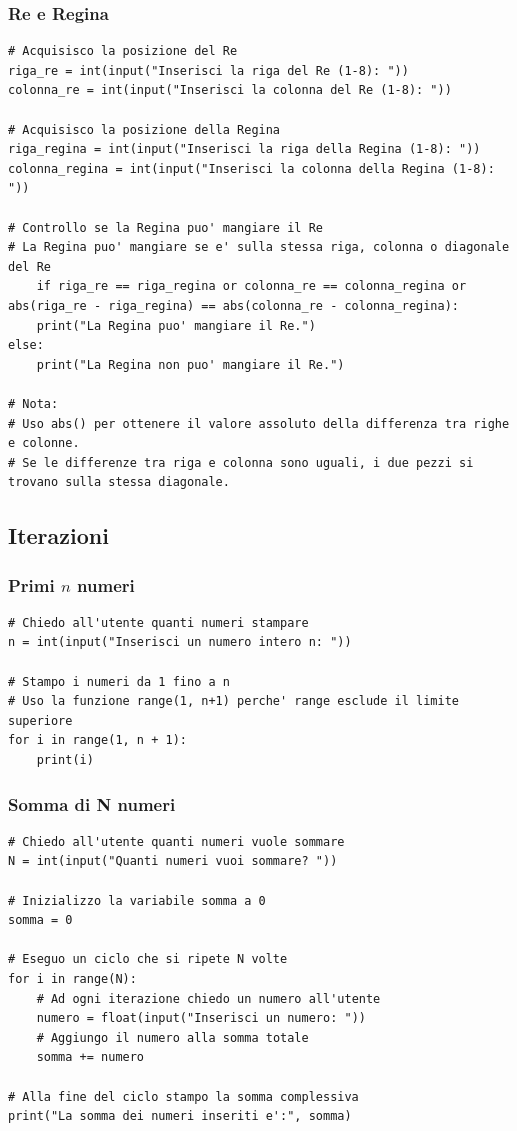 \documentclass[a4paper,12pt]{article}
\begin{document}
\newpage
\subsubsection{Re e Regina}
\begin{lstlisting}
# Acquisisco la posizione del Re
riga_re = int(input("Inserisci la riga del Re (1-8): "))
colonna_re = int(input("Inserisci la colonna del Re (1-8): "))

# Acquisisco la posizione della Regina
riga_regina = int(input("Inserisci la riga della Regina (1-8): "))
colonna_regina = int(input("Inserisci la colonna della Regina (1-8): "))

# Controllo se la Regina puo' mangiare il Re
# La Regina puo' mangiare se e' sulla stessa riga, colonna o diagonale del Re
	if riga_re == riga_regina or colonna_re == colonna_regina or abs(riga_re - riga_regina) == abs(colonna_re - colonna_regina):
	print("La Regina puo' mangiare il Re.")
else:
	print("La Regina non puo' mangiare il Re.")

# Nota:
# Uso abs() per ottenere il valore assoluto della differenza tra righe e colonne.
# Se le differenze tra riga e colonna sono uguali, i due pezzi si trovano sulla stessa diagonale.

\end{lstlisting}

\newpage
\subsection{Iterazioni}



\subsubsection{Primi $n$ numeri}
\begin{lstlisting}
# Chiedo all'utente quanti numeri stampare
n = int(input("Inserisci un numero intero n: "))

# Stampo i numeri da 1 fino a n
# Uso la funzione range(1, n+1) perche' range esclude il limite superiore
for i in range(1, n + 1):
	print(i)

\end{lstlisting}


\newpage
\subsubsection{Somma di N numeri}
\begin{lstlisting}
# Chiedo all'utente quanti numeri vuole sommare
N = int(input("Quanti numeri vuoi sommare? "))

# Inizializzo la variabile somma a 0
somma = 0

# Eseguo un ciclo che si ripete N volte
for i in range(N):
	# Ad ogni iterazione chiedo un numero all'utente
	numero = float(input("Inserisci un numero: "))
	# Aggiungo il numero alla somma totale
	somma += numero

# Alla fine del ciclo stampo la somma complessiva
print("La somma dei numeri inseriti e':", somma)

\end{lstlisting}
\end{document}
